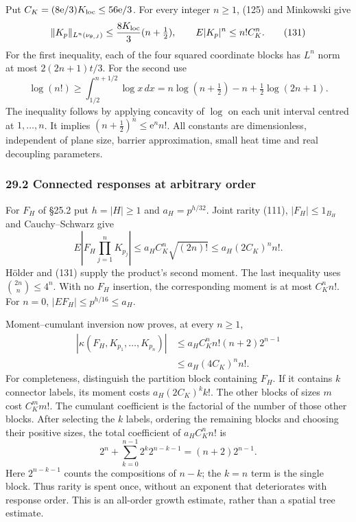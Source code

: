 \documentclass[11pt,a4paper]{article}
\begin{document}
Put \(C_K=(8\mathrm e/3)K_{\rm loc}\le56\mathrm e/3\). For every integer
\(n\ge1\), (125) and Minkowski give \[\|K_p\|_{L^n(\nu_{\theta,J})}
\le\frac{8K_{\rm loc}}3(n+\tfrac12),\qquad
E|K_p|^n\le n!C_K^n.\tag{131}\] For the first inequality, each of the
four squared coordinate blocks has \(L^n\) norm at most \(2(2n+1)t/3\).
For the second use \[\log(n!)\ge\int_{1/2}^{n+1/2}\log x\,dx
=n\log(n+\tfrac12)-n+\tfrac12\log(2n+1).\] The inequality follows by
applying concavity of \(\log\) on each unit interval centred at
\(1,\ldots,n\). It implies \((n+\tfrac12)^n\le\mathrm e^n n!\). All
constants are dimensionless, independent of plane size, barrier
approximation, small heat time and real decoupling parameters.

\hypertarget{connected-responses-at-arbitrary-order}{%
\subsubsection{29.2 Connected responses at arbitrary
order}\label{connected-responses-at-arbitrary-order}}

For \(F_H\) of §25.2 put \(h=|H|\ge1\) and \(a_H=p^{h/32}\). Joint
rarity (111), \(|F_H|\le1_{B_H}\) and Cauchy--Schwarz give
\[E\left|F_H\prod_{j=1}^n K_{p_j}\right|
\le a_H C_K^n\sqrt{(2n)!}
\le a_H(2C_K)^n n!.\] Hölder and (131) supply the product's second
moment. The last inequality uses \(\binom{2n}{n}\le4^n\). With no
\(F_H\) insertion, the corresponding moment is at most \(C_K^n n!\). For
\(n=0\), \(|EF_H|\le p^{h/16}\le a_H\).

Moment--cumulant inversion now proves, at every \(n\ge1\),
\[\begin{aligned}
|\kappa(F_H,K_{p_1},\ldots,K_{p_n})|
&\le a_H C_K^n n!(n+2)2^{n-1}\\
&\le a_H(4C_K)^n n!.
\end{aligned}\tag{132}\] For completeness, distinguish the partition
block containing \(F_H\). If it contains \(k\) connector labels, its
moment costs \(a_H(2C_K)^k k!\). The other blocks of sizes \(m\) cost
\(C_K^m m!\). The cumulant coefficient is the factorial of the number of
those other blocks. After selecting the \(k\) labels, ordering the
remaining blocks and choosing their positive sizes, the total
coefficient of \(a_H C_K^n n!\) is \[2^n+\sum_{k=0}^{n-1}2^k2^{n-k-1}
=(n+2)2^{n-1}.\] Here \(2^{n-k-1}\) counts the compositions of \(n-k\);
the \(k=n\) term is the single block. Thus rarity is spent once, without
an exponent that deteriorates with response order. This is an all-order
growth estimate, rather than a spatial tree estimate.
\end{document}
